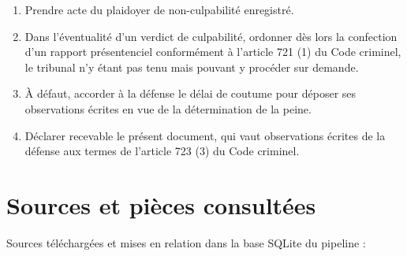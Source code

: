 \documentclass[12pt,a4paper]{article}
\begin{document}
\begin{enumerate}[leftmargin=*]
\item Prendre acte du plaidoyer de non-culpabilité enregistré.
\item Dans l'éventualité d'un verdict de culpabilité, ordonner dès lors la confection d'un rapport présentenciel conformément à l'article 721 (1) du Code criminel, le tribunal n'y étant pas tenu mais pouvant y procéder sur demande.
\item À défaut, accorder à la défense le délai de coutume pour déposer ses observations écrites en vue de la détermination de la peine.
\item Déclarer recevable le présent document, qui vaut observations écrites de la défense aux termes de l'article 723 (3) du Code criminel.
\end{enumerate}

\section{Sources et pièces consultées}
Sources téléchargées et mises en relation dans la base SQLite du pipeline :
\end{document}
